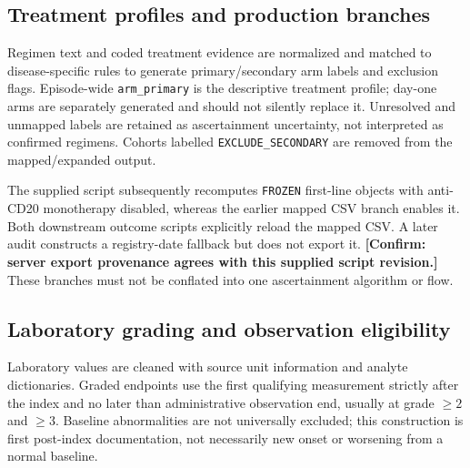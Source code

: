\documentclass[10pt]{article}
\newcommand{\pending}[1]{\textbf{[Confirm: #1]}}
\begin{document}
\subsection*{Treatment profiles and production branches}
Regimen text and coded treatment evidence are normalized and matched to
disease-specific rules to generate primary/secondary arm labels and exclusion
flags. Episode-wide \texttt{arm\_primary} is the descriptive treatment profile;
day-one arms are separately generated and should not silently replace it.
Unresolved and unmapped labels are retained as ascertainment uncertainty,
not interpreted as confirmed regimens. Cohorts labelled
\texttt{EXCLUDE\_SECONDARY} are removed from the mapped/expanded output.

The supplied script subsequently recomputes \texttt{FROZEN} first-line objects
with anti-CD20 monotherapy disabled, whereas the earlier mapped CSV branch
enables it. Both downstream outcome scripts explicitly reload the mapped CSV.
A later audit constructs a registry-date fallback but does not export it.
\pending{server export provenance agrees with this supplied script revision.}
These branches must not be conflated into one ascertainment algorithm or flow.

\subsection*{Laboratory grading and observation eligibility}
Laboratory values are cleaned with source unit information and analyte
dictionaries. Graded endpoints use the first qualifying measurement strictly
after the index and no later than administrative observation end, usually at
grade $\geq2$ and $\geq3$. Baseline abnormalities are not universally excluded;
this construction is first post-index documentation, not necessarily new onset
or worsening from a normal baseline.
\end{document}
